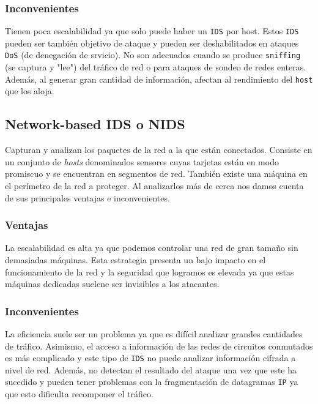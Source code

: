\documentclass[12pt]{article}
\newcommand{\newpar} {
    \vskip 0.5cm
}
\begin{document}
            \subsubsection{Inconvenientes}
                Tienen poca escalabilidad ya que solo puede haber un \texttt{IDS} por host. Estos \texttt{IDS} pueden ser también objetivo de ataque y pueden ser deshabilitados en ataques \texttt{DoS} (de denegación de srvicio). No son adecuados cuando se produce \texttt{sniffing} (se captura y "lee") del tráfico de red o para ataques de sondeo de redes enteras. Además, al generar gran cantidad de información, afectan al rendimiento del \texttt{host} que los aloja.


        \subsection{Network-based IDS o NIDS}
            Capturan y analizan los paquetes de la red a la que están conectados. Consiste en un conjunto de \textit{hosts} denominados sensores cuyas tarjetas están en modo promiscuo y se encuentran en segmentos de red. También existe una máquina en el perímetro de la red a proteger. Al analizarlos más de cerca nos damos cuenta de sus principales ventajas e inconvenientes.

            \subsubsection{Ventajas}
                La escalabilidad es alta ya que podemos controlar una red de gran tamaño sin demasiadas máquinas. Esta estrategia presenta un bajo impacto en el funcionamiento de la red y la seguridad que logramos es elevada ya que estas máquinas dedicadas suelene ser invisibles a los atacantes.

            \subsubsection{Inconvenientes}
                La eficiencia suele ser un problema ya que es difícil analizar grandes cantidades de tráfico. Asimismo, el acceso a información de las redes de circuitos conmutados es más complicado y este tipo de \texttt{IDS} no puede analizar información cifrada a nivel de red. Además, no detectan el resultado del ataque una vez que este ha sucedido y pueden tener problemas con la fragmentación de datagramas \texttt{IP} ya que esto dificulta recomponer el tráfico.

                \newpar
\end{document}
